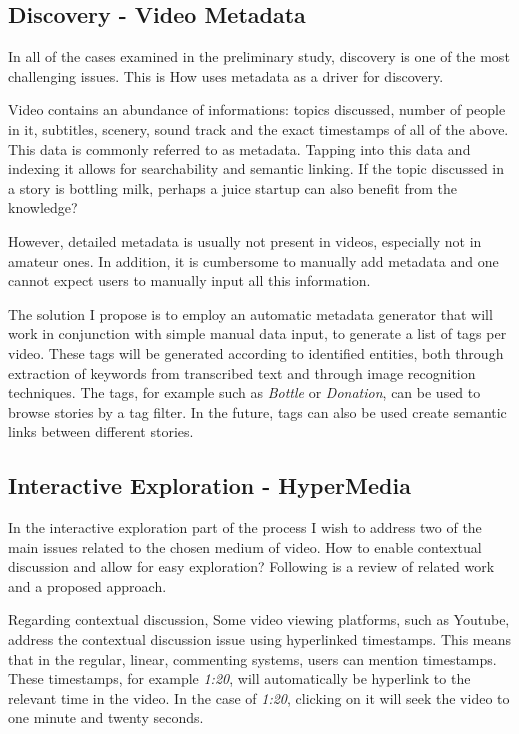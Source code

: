 \subsection{Discovery - Video Metadata}
In all of the cases examined in the preliminary study, discovery is one of the most challenging issues. This is How uses metadata as a driver for discovery. 

Video contains an abundance of informations: topics discussed, number of people in it, subtitles, scenery, sound track and the exact timestamps of all of the above. This data is commonly referred to as metadata. Tapping into this data and indexing it allows for searchability and semantic linking\cite{jain1994metadata}. If the topic discussed in a story is bottling milk, perhaps a juice startup can also benefit from the knowledge?

However, detailed metadata is usually not present in videos, especially not in amateur ones. In addition, it is cumbersome to manually add metadata and one cannot expect users to manually input all this information.

The solution I propose is to employ an automatic metadata generator that will work in conjunction with simple manual data input, to generate a list of tags per video. These tags will be generated according to identified entities, both through extraction of keywords from transcribed text and through image recognition techniques. The tags, for example such as \textit{Bottle} or \textit{Donation}, can be used to browse stories by a tag filter. In the future, tags can also be used create semantic links between different stories.

\subsection{Interactive Exploration - HyperMedia}

In the interactive exploration part of the process I wish to address two of the main issues related to the chosen medium of video. How to enable contextual discussion and allow for easy exploration? Following is a review of related work and a proposed approach. 

Regarding contextual discussion, Some video viewing platforms, such as Youtube, address the contextual discussion issue using hyperlinked timestamps. This means that in the regular, linear, commenting systems, users can mention timestamps. These timestamps, for example  \textit{1:20}, will automatically be hyperlink to the relevant time in the video. In the case of \textit{1:20}, clicking on it will seek the video to one minute and twenty seconds. 

